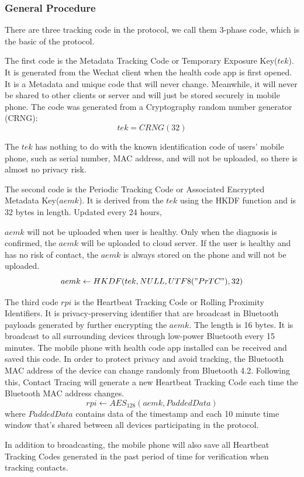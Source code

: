\documentclass[11pt,en]{elegantpaper}
\begin{document}
\subsubsection{General Procedure}
There are three tracking code in the protocol\label{fig1}, we call them 3-phase code, which is the basic of the protocol. 

The first code is the Metadata Tracking Code or Temporary Exposure Key($tek$). It is generated from the Wechat client when the health code app is first opened. It is a Metadata and unique code that will never change. Meanwhile, it will never be shared to other clients or server and will just be stored securely in mobile phone. The code was generated from a Cryptography random number generator (CRNG):
$$tek = CRNG(32)$$

The $tek$ has nothing to do with the known identification code of users' mobile phone, such as serial number, MAC address, and will not be uploaded, so there is almost no privacy risk.

The second code is the Periodic Tracking Code or Associated Encrypted Metadata Key($aemk$). It is derived from the $tek$ using the HKDF function and is 32 bytes in length. Updated every 24 hours,

$aemk$ will not be uploaded when user is healthy. Only when the diagnosis is confirmed, the $aemk$ will be uploaded to cloud server. If the user is healthy and has no risk of contact, the $aemk$ is always stored on the phone and will not be uploaded.
$$aemk\leftarrow{HKDF(tek,NULL,UTF8("PrTC"),32)}$$

The third code $rpi$ is the Heartbeat Tracking Code or Rolling Proximity Identifiers. It is privacy-preserving identifier that are broadcast in Bluetooth payloads generated by further encrypting the $aemk$. The length is 16 bytes. It is broadcast to all surrounding devices through low-power Bluetooth every 15 minutes. The mobile phone with health code app installed can be received and saved this code. In order to protect privacy and avoid tracking, the Bluetooth MAC address of the device can change randomly from Bluetooth 4.2. Following this, Contact Tracing will generate a new Heartbeat Tracking Code each time the Bluetooth MAC address changes.
$$rpi\leftarrow AES_{128}(aemk, PaddedData)$$ where $PaddedData$ contains data of the timestamp and each 10 minute time window that’s shared between all devices participating in the protocol.

In addition to broadcasting, the mobile phone will also save all Heartbeat Tracking Codes generated in the past period of time for verification when tracking contacts.
\end{document}
